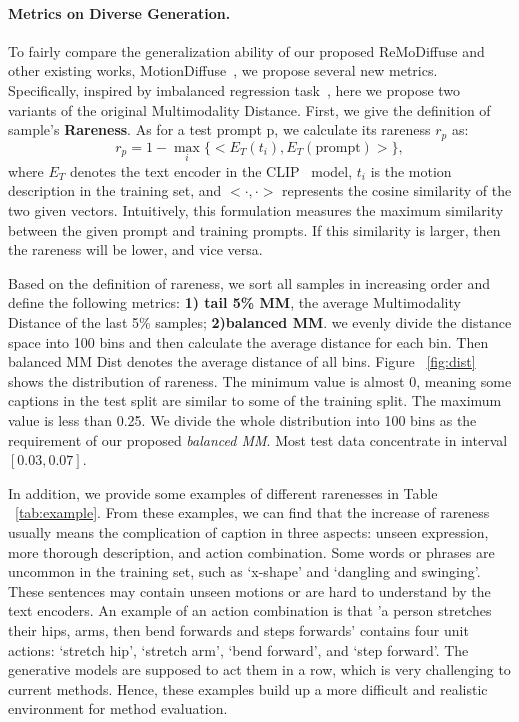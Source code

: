 \documentclass[10pt,twocolumn,letterpaper]{article}
\newcommand{\name}{ReMoDiffuse\xspace}
\begin{document}
\paragraph{Metrics on Diverse Generation.} To fairly compare the generalization ability of our proposed \name and other existing works, \eg MotionDiffuse~\cite{zhang2022motiondiffuse}, we propose several new metrics. Specifically, inspired by imbalanced regression task~\cite{ren2022balanced}, here we propose two variants of the original Multimodality Distance. First, we give the definition of sample's \textbf{Rareness}. As for a test prompt $\mathrm{p}$, we calculate its rareness $r_p$ as:
\begin{equation}
    r_p = 1 - \max\limits_i \{<E_T(t_i), E_T(\mathrm{prompt})>\},
\end{equation}
where $E_T$ denotes the text encoder in the CLIP~\cite{radford2021learning} model, $t_i$ is the motion description in the training set, and $<\cdot, \cdot>$ represents the cosine similarity of the two given vectors. Intuitively, this formulation measures the maximum similarity between the given prompt and training prompts. If this similarity is larger, then the rareness will be lower, and vice versa.

Based on the definition of rareness, we sort all samples in increasing order and define the following metrics: \textbf{1) tail 5\% MM}, the average Multimodality Distance of the last 5\% samples; \textbf{2)balanced MM}. we evenly divide the distance space into 100 bins and then calculate the average distance for each bin. Then balanced MM Dist denotes the average distance of all bins. Figure ~\ref{fig:dist} shows the distribution of rareness. The minimum value is almost 0, meaning some captions in the test split are similar to some of the training split. The maximum value is less than 0.25. We divide the whole distribution into 100 bins as the requirement of our proposed \textit{balanced MM}. Most test data concentrate in interval $[0.03, 0.07]$.

In addition, we provide some examples of different rarenesses in Table ~\ref{tab:example}. From these examples, we can find that the increase of rareness usually means the complication of caption in three aspects: unseen expression, more thorough description, and action combination. Some words or phrases are uncommon in the training set, such as `x-shape' and `dangling and swinging'. These sentences may contain unseen motions or are hard to understand by the text encoders. An example of an action combination is that 'a person stretches their hips, arms, then bend forwards and steps forwards' contains four unit actions: `stretch hip', `stretch arm', `bend forward', and `step forward'. The generative models are supposed to act them in a row, which is very challenging to current methods. Hence, these examples build up a more difficult and realistic environment for method evaluation.
\end{document}
